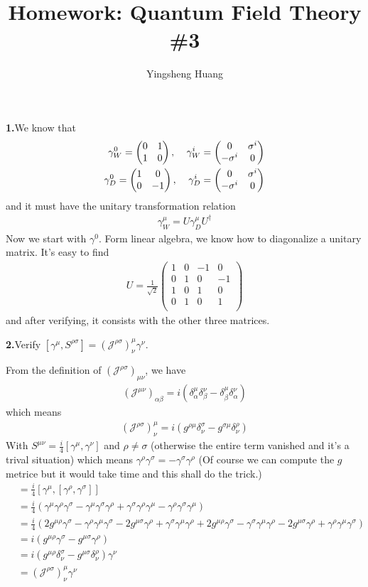 \documentclass{article}
\title{Homework: Quantum Field Theory \#3}
\author{Yingsheng Huang}
\newcommand{\gm}{\gamma^{\mu}}
\newcommand{\gn}{\gamma^{\nu}}
\newcommand{\gs}{\gamma^{\sigma}}
\newcommand{\gr}{\gamma^{\rho}}
\newcommand{\gmr}{g^{\mu\rho}}
\newcommand{\gms}{g^{\mu\sigma}}
\newcommand{\Jrsmn}{(\mathcal{J}^{\rho\sigma})^{\mu}_{\nu}}
\begin{document}
\maketitle
{\bf1.}\quad We know that
\begin{align}
  \gamma^0_W=\pmqty{0&1\\1&0},\;\;\;\;\gamma^i_W=\pmqty{0&\sigma^i\\-\sigma^i&0}\\
  \gamma^0_D=\pmqty{1&0\\0&-1},\;\;\;\;\gamma^i_D=\pmqty{0&\sigma^i\\-\sigma^i&0}
\end{align}
and it must have the unitary transformation relation
\begin{align}
  \gamma^{\mu}_W=U\gamma^{\mu}_D U^{\dagger}
\end{align}
Now we start with $\gamma^0$. Form linear algebra, we know how to diagonalize a unitary matrix. It's easy to find
\begin{align*}
  U=\frac{1}{\sqrt{2}}\left(
\begin{array}{cccc}
 1 & 0 & -1 & 0 \\
 0 & 1 & 0 & -1 \\
 1 & 0 & 1 & 0 \\
 0 & 1 & 0 & 1 \\
\end{array}
\right)
\end{align*}
and after verifying, it consists with the other three matrices.

{\bf2.}\quad Verify $[\gamma^{\mu},S^{\rho\sigma}]=(\mathcal{J}^{\rho\sigma})^{\mu}_{\nu}\gamma^{\nu}$.

From the definition of $(\mathcal{J}^{\rho\sigma})_{\mu\nu}$, we have
\begin{align}
  (\mathcal{J}^{\mu\nu})_{\alpha\beta}=i(\delta^{\mu}_{\alpha}\delta^{\nu}_{\beta}-\delta^{\mu}_{\beta}\delta^{\nu}_{\alpha})
\end{align}
which means
\begin{align*}
  (\mathcal{J}^{\rho\sigma})^{\mu}_{\nu}=i(g^{\rho\mu}\delta^{\sigma}_{\nu}-g^{\sigma\mu}\delta^{\rho}_{\nu})
\end{align*}
With $S^{\mu\nu}=\frac{i}{4}[\gm,\gn]$ and $\rho\neq\sigma$ (otherwise the entire term vanished and it's a trival situation) which means $\gr\gs=-\gs\gr$ (Of course we can compute the $g$ metrice but it would take time and this shall do the trick.)
\begin{align*}
  [\gamma^{\mu},S^{\rho\sigma}]&=\frac{i}{4}[\gm,[\gr,\gs]]\\
  &=\frac{i}{4}(\gm\gr\gs-\gm\gs\gr+\gs\gr\gm-\gr\gs\gm)\\
  &=\frac{i}{4}(2\gmr\gs-\gr\gm\gs-2\gms\gr+\gs\gm\gr+2\gmr\gs-\gs\gm\gr-2\gms\gr+\gr\gm\gs)\\
  &=i(\gmr\gs-\gms\gr)\\&=i(\gmr\delta^{\sigma}_{\nu}-\gms\delta^{\rho}_{\nu})\gn\\&=\Jrsmn\gn
\end{align*}
\end{document}
